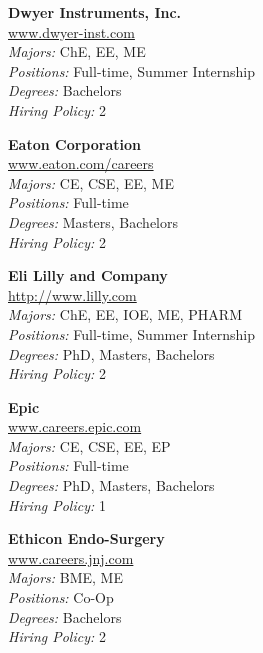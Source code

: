 \documentclass[twoside]{article}
\begin{document}
\begin{center}
\begin{multicols}{3}
\begin{minipage}{.9\columnwidth}{\Large\bf Dwyer Instruments, Inc. }\\
	\url{www.dwyer-inst.com}\\
	\emph{Majors:} ChE, EE, ME\\
	\emph{Positions:} Full-time, Summer Internship\\
	\emph{Degrees:} Bachelors\\
	\emph{Hiring Policy:} 2\\
\end{minipage}
 
\begin{minipage}{.9\columnwidth}{\Large\bf Eaton Corporation }\\
	\url{www.eaton.com/careers}\\
	\emph{Majors:} CE, CSE, EE, ME\\
	\emph{Positions:} Full-time\\
	\emph{Degrees:} Masters, Bachelors\\
	\emph{Hiring Policy:} 2\\
\end{minipage}
 
\begin{minipage}{.9\columnwidth}{\Large\bf Eli Lilly and Company }\\
	\url{http://www.lilly.com}\\
	\emph{Majors:} ChE, EE, IOE, ME, PHARM\\
	\emph{Positions:} Full-time, Summer Internship\\
	\emph{Degrees:} PhD, Masters, Bachelors\\
	\emph{Hiring Policy:} 2\\
\end{minipage}
 
\begin{minipage}{.9\columnwidth}{\Large\bf Epic }\\
	\url{www.careers.epic.com}\\
	\emph{Majors:} CE, CSE, EE, EP\\
	\emph{Positions:} Full-time\\
	\emph{Degrees:} PhD, Masters, Bachelors\\
	\emph{Hiring Policy:} 1\\
\end{minipage}
 
\begin{minipage}{.9\columnwidth}{\Large\bf Ethicon Endo-Surgery }\\
	\url{www.careers.jnj.com}\\
	\emph{Majors:} BME, ME\\
	\emph{Positions:} Co-Op\\
	\emph{Degrees:} Bachelors\\
	\emph{Hiring Policy:} 2\\
\end{minipage}
 

\end{multicols}
\end{center}
\end{document}
